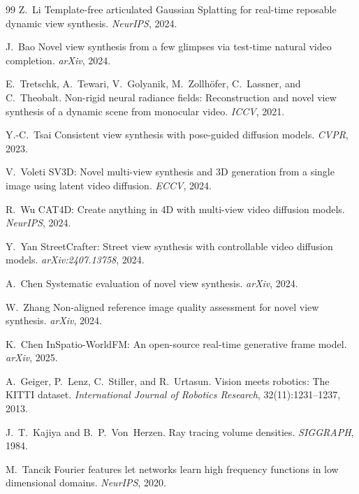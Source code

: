 \begin{thebibliography}{99}
Z.~Li \etal
Template-free articulated Gaussian Splatting for real-time reposable dynamic
view synthesis.
\emph{NeurIPS}, 2024.


J.~Bao \etal
Novel view synthesis from a few glimpses via test-time natural video completion.
\emph{arXiv}, 2024.


E.~Tretschk, A.~Tewari, V.~Golyanik, M.~Zollh\"{o}fer, C.~Lassner, and
C.~Theobalt.
Non-rigid neural radiance fields: Reconstruction and novel view synthesis of
a dynamic scene from monocular video.
\emph{ICCV}, 2021.


Y.-C.~Tsai \etal
Consistent view synthesis with pose-guided diffusion models.
\emph{CVPR}, 2023.


V.~Voleti \etal
SV3D: Novel multi-view synthesis and 3D generation from a single image using
latent video diffusion.
\emph{ECCV}, 2024.


R.~Wu \etal
CAT4D: Create anything in 4D with multi-view video diffusion models.
\emph{NeurIPS}, 2024.


Y.~Yan \etal
StreetCrafter: Street view synthesis with controllable video diffusion models.
\emph{arXiv:2407.13758}, 2024.


A.~Chen \etal
Systematic evaluation of novel view synthesis.
\emph{arXiv}, 2024.


W.~Zhang \etal
Non-aligned reference image quality assessment for novel view synthesis.
\emph{arXiv}, 2024.


K.~Chen \etal
InSpatio-WorldFM: An open-source real-time generative frame model.
\emph{arXiv}, 2025.



A.~Geiger, P.~Lenz, C.~Stiller, and R.~Urtasun.
Vision meets robotics: The KITTI dataset.
\emph{International Journal of Robotics Research}, 32(11):1231--1237, 2013.


J.~T.~Kajiya and B.~P.~Von~Herzen.
Ray tracing volume densities.
\emph{SIGGRAPH}, 1984.


M.~Tancik \etal
Fourier features let networks learn high frequency functions in low dimensional
domains.
\emph{NeurIPS}, 2020.



\end{thebibliography}
